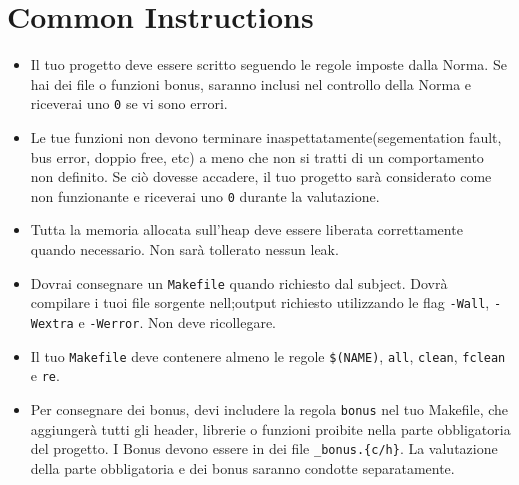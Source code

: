 
\chapter{Common Instructions}
    \begin{itemize}

	\item Il tuo progetto deve essere scritto seguendo le regole imposte
	dalla Norma. Se hai dei file o funzioni bonus, saranno inclusi nel controllo
	della Norma e riceverai uno \texttt{0} se vi sono errori.

	\item Le tue funzioni non devono terminare inaspettatamente(segementation
	fault, bus error, doppio free, etc) a meno che non si tratti di un comportamento
	non definito. Se ciò dovesse accadere, il tuo progetto sarà considerato come
	non funzionante e riceverai uno \texttt{0} durante la valutazione.

	\item Tutta la memoria allocata sull'heap deve essere liberata correttamente 
	quando necessario. Non sarà tollerato nessun leak.
	
	\item Dovrai consegnare un \texttt{Makefile} quando richiesto dal subject.
	Dovrà compilare i tuoi file sorgente nell;output richiesto utilizzando le flag 
	\texttt{-Wall}, \texttt{-Wextra} e \texttt{-Werror}.
	Non deve ricollegare.
	
	\item Il tuo \texttt{Makefile} deve contenere almeno le regole
        \texttt{\$(NAME)}, \texttt{all}, \texttt{clean},
        \texttt{fclean} e \texttt{re}.
      
	\item Per consegnare dei bonus, devi includere la regola \texttt{bonus} 
	nel tuo Makefile, che aggiungerà tutti gli header, librerie o funzioni proibite
	nella parte obbligatoria del progetto.
	I Bonus devono essere in dei file \texttt{\*\_bonus.\{c/h\}}. La valutazione della
	parte obbligatoria e dei bonus saranno condotte separatamente.
	

\end{itemize}

